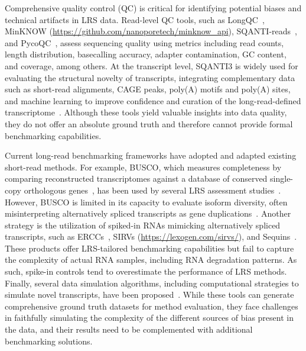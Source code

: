\documentclass[pdflatex,sn-nature]{sn-jnl}%
\begin{document}
Comprehensive quality control (QC) is critical for identifying potential biases and technical artifacts in LRS data. Read-level QC tools, such as LongQC~\cite{Fukasawa2020LongQC}, MinKNOW (\url{https://github.com/nanoporetech/minknow_api}), SQANTI-reads~\cite{Keil2024SQANTI}, and PycoQC~\cite{Leger2019pycoQC}, assess sequencing quality using metrics including read counts, length distribution, basecalling accuracy, adapter contamination, GC content, and coverage, among others. At the transcript level, SQANTI3 is widely used for evaluating the structural novelty of transcripts, integrating complementary data such as short-read alignments, CAGE peaks, poly(A) motifs and poly(A) sites, and machine learning to improve confidence and curation of the long-read-defined transcriptome~\cite{PardoPalacios2024SQANTI3}. Although these tools yield valuable insights into data quality, they do not offer an absolute ground truth and therefore cannot provide formal benchmarking capabilities.

Current long-read benchmarking frameworks have adopted and adapted existing short-read methods. For example, BUSCO, which measures completeness by comparing reconstructed transcriptomes against a database of conserved single-copy orthologous genes~\cite{Simao2015BUSCO}, has been used by several LRS assessment studies~\cite{Velasco2022Longread,Nip2023Reference,PardoPalacios2024Systematic}. However, BUSCO is limited in its capacity to evaluate isoform diversity, often misinterpreting alternatively spliced transcripts as gene duplications~\cite{Nenasheva2024Annotation,Paniagua2025Evaluation}. Another strategy is the utilization of spiked-in RNAs mimicking alternatively spliced transcripts, such as ERCCs~\cite{Jiang2011Synthetic}, SIRVs (\url{https://lexogen.com/sirvs/}), and Sequins~\cite{Hardwick2016Spliced}. These products offer LRS-tailored benchmarking capabilities but fail to capture the complexity of actual RNA samples, including RNA degradation patterns. As such, spike-in controls tend to overestimate the performance of LRS methods. Finally, several data simulation algorithms, including computational strategies to simulate novel transcripts, have been proposed~\cite{Coombe2023NanoSim,Ono2022PBSIM3,MestreTomas2023SQANTI}. While these tools can generate comprehensive ground truth datasets for method evaluation, they face challenges in faithfully simulating the complexity of the different sources of bias present in the data, and their results need to be complemented with additional benchmarking solutions.
\end{document}
